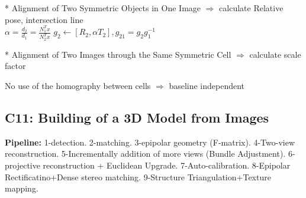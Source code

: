 \documentclass{../cheat}
\begin{document}
\begin{multicols}{3}
	* Alignment of Two Symmetric Objects in One Image $\Rightarrow$ calculate Relative pose, intersection line\\
	$\alpha=\frac{d_2}{d_1}=\frac{N_1^T x}{N_2^T x}$ \hfill $g_2 \leftarrow [R_2, \alpha T_2], g_{21}=g_2 g_1^{-1}$
	
	* Alignment of Two Images through the Same Symmetric Cell $\Rightarrow$ calculate scale factor
	
	No use of the homography between cells $\Rightarrow$ baseline independent
	
\subsection{C11: Building of a 3D Model from Images}
	\textbf{Pipeline:}
	1-detection.
	2-matching.
	3-epipolar geometry (F-matrix).
	4-Two-view reconstruction.
	5-Incrementally addition of more views (Bundle Adjustment).
	6-projective reconstruction + Euclidean Upgrade.
	7-Auto-calibration.
	8-Epipolar Rectificatino+Dense stereo matching.
	9-Structure Triangulation+Texture mapping.



\end{multicols}
\end{document}
